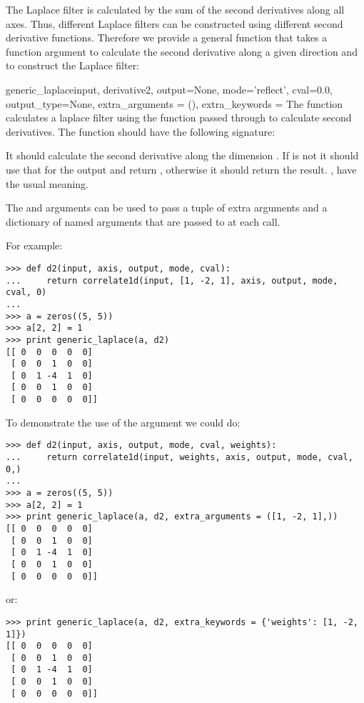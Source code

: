 The Laplace filter is calculated by the sum of the second derivatives along 
all axes. Thus, different Laplace filters can be constructed using 
different second derivative functions. Therefore we provide a general 
function that takes a function argument to calculate the second derivative 
along a given direction and to construct the Laplace filter:

\begin{funcdesc}{generic_laplace}{input, derivative2, output=None,
  mode='reflect', cval=0.0, output_type=None, extra_arguments = (), 
  extra_keywords = {}} The function 
   calculates a laplace filter using the
  function passed through  to calculate second 
  derivatives. The function  should have the 
  following signature:

  
  It should calculate the second derivative along the dimension . 
  If  is not  it should use that for the output 
  and return , otherwise it should return the result. 
  ,  have the usual meaning.
  
  The  and  arguments can be used 
  to pass a tuple of extra arguments and a dictionary of named 
  arguments that are passed to  at each call.

  For example:
\begin{verbatim}
>>> def d2(input, axis, output, mode, cval):
...     return correlate1d(input, [1, -2, 1], axis, output, mode, cval, 0)
... 
>>> a = zeros((5, 5))
>>> a[2, 2] = 1
>>> print generic_laplace(a, d2)
[[ 0  0  0  0  0]
 [ 0  0  1  0  0]
 [ 0  1 -4  1  0]
 [ 0  0  1  0  0]
 [ 0  0  0  0  0]]
\end{verbatim}
To demonstrate the use of the  argument we could do:
\begin{verbatim}
>>> def d2(input, axis, output, mode, cval, weights):
...     return correlate1d(input, weights, axis, output, mode, cval, 0,)
... 
>>> a = zeros((5, 5))
>>> a[2, 2] = 1
>>> print generic_laplace(a, d2, extra_arguments = ([1, -2, 1],))
[[ 0  0  0  0  0]
 [ 0  0  1  0  0]
 [ 0  1 -4  1  0]
 [ 0  0  1  0  0]
 [ 0  0  0  0  0]]
\end{verbatim}
or:
\begin{verbatim}
>>> print generic_laplace(a, d2, extra_keywords = {'weights': [1, -2, 1]})
[[ 0  0  0  0  0]
 [ 0  0  1  0  0]
 [ 0  1 -4  1  0]
 [ 0  0  1  0  0]
 [ 0  0  0  0  0]]
\end{verbatim}
\end{funcdesc}

